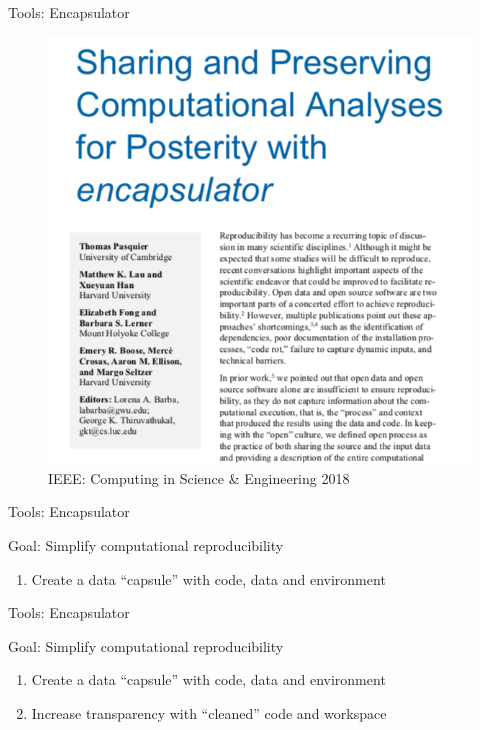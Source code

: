 \documentclass[ignorenonframetext,]{beamer}
\providecommand{\tightlist}{%
  \setlength{\itemsep}{0pt}\setlength{\parskip}{0pt}}
\begin{document}
\begin{frame}{Tools: Encapsulator}
\protect\hypertarget{tools-encapsulator}{}

\begin{figure}
\centering
\includegraphics{CISE2018.png}
\caption{IEEE: Computing in Science \& Engineering 2018}
\end{figure}

\end{frame}

\begin{frame}{Tools: Encapsulator}
\protect\hypertarget{tools-encapsulator-1}{}

Goal: Simplify computational reproducibility

\begin{enumerate}
\tightlist
\item
  Create a data ``capsule'' with code, data and environment
\end{enumerate}

\end{frame}

\begin{frame}{Tools: Encapsulator}
\protect\hypertarget{tools-encapsulator-2}{}

Goal: Simplify computational reproducibility

\begin{enumerate}
\tightlist
\item
  Create a data ``capsule'' with code, data and environment
\item
  Increase transparency with ``cleaned'' code and workspace
\end{enumerate}

\end{frame}
\end{document}
